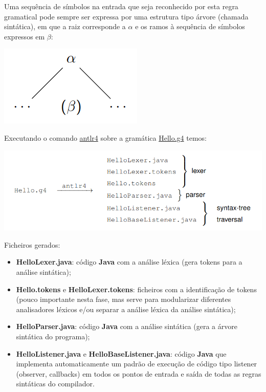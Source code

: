 \documentclass{article}
\begin{document}
\begin{flushleft}
  \item Uma sequência de símbolos na entrada que seja
  reconhecido por esta regra gramatical pode sempre ser
  expressa por uma estrutura tipo árvore (chamada
  sintática), em que a raiz corresponde a $\alpha$ e os ramos à
  sequência de símbolos expressos em $\beta$:

  \begin{center}
    \includegraphics[scale=0.3]{22}
  \end{center}

  \item Executando o comando \uline{antlr4} sobre a gramática \uline{Hello.g4} temos:
  
  \begin{center}
    \includegraphics[scale=0.4]{23}
  \end{center}


  \pagebreak

  \item Ficheiros gerados:
  \begin{itemize}
    \item \textbf{HelloLexer.java}: código \textbf{Java} com a análise léxica
    (gera tokens para a análise sintática);
    \item \textbf{Hello.tokens} e \textbf{HelloLexer.tokens}: ficheiros com a
    identificação de tokens (pouco importante nesta fase, mas
    serve para modularizar diferentes analisadores léxicos e/ou
    separar a análise léxica da análise sintática);
    \item \textbf{HelloParser.java}: código \textbf{Java} com a análise
    sintática (gera a árvore sintática do programa);
    \item \textbf{HelloListener.java} e \textbf{HelloBaseListener.java}:
    código \textbf{Java} que implementa automaticamente um padrão
    de execução de código tipo listener (observer, callbacks)
    em todos os pontos de entrada e saída de todas as regras
    sintáticas do compilador.
  \end{itemize}


\end{flushleft}
\end{document}
